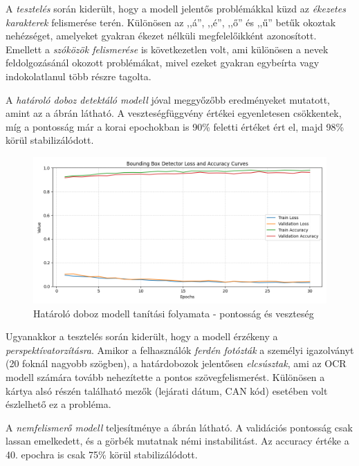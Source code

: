 \documentclass[
]{thesis-ekf}
\theoremstyle{definition}
\theoremstyle{remark}
\begin{document}
A \emph{tesztelés} során kiderült, hogy a modell jelentős problémákkal küzd az \emph{ékezetes karakterek} felismerése terén. Különösen az ,,á'', ,,é'', ,,ő'' és ,,ű'' betűk okoztak nehézséget, amelyeket gyakran ékezet nélküli megfelelőikként azonosított. Emellett a \emph{szóközök felismerése} is következetlen volt, ami különösen a nevek feldolgozásánál okozott problémákat, mivel ezeket gyakran egybeírta vagy indokolatlanul több részre tagolta.

A \emph{határoló doboz detektáló modell} jóval meggyőzőbb eredményeket mutatott, amint az a  ábrán látható. A veszteségfüggvény értékei egyenletesen csökkentek, míg a pontosság már a korai epochokban is 90\% feletti értéket ért el, majd 98\% körül stabilizálódott.

\begin{figure} \centering \includegraphics[width=\textwidth]{ideal_learning_curves} \caption{Határoló doboz modell tanítási folyamata - pontosság és veszteség} \label{fig-bbox-training} \end{figure}

Ugyanakkor a tesztelés során kiderült, hogy a modell érzékeny a \emph{perspektívatorzításra}. Amikor a felhasználók \emph{ferdén fotózták} a személyi igazolványt (20 foknál nagyobb szögben), a határdobozok jelentősen \emph{elcsúsztak}, ami az OCR modell számára tovább nehezítette a pontos szövegfelismerést. Különösen a kártya alsó részén található mezők (lejárati dátum, CAN kód) esetében volt észlelhető ez a probléma.

A \emph{nemfelismerő modell} teljesítménye a  ábrán látható. A validációs pontosság csak lassan emelkedett, és a görbék mutatnak némi instabilitást. Az accuracy értéke a 40. epochra is csak 75\% körül stabilizálódott.
\end{document}
